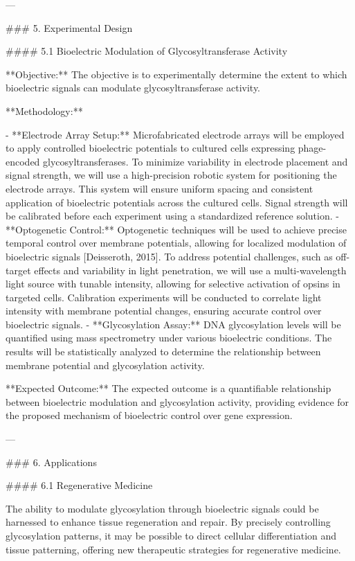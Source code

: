 ---

### 5. Experimental Design

#### 5.1 Bioelectric Modulation of Glycosyltransferase Activity

**Objective:** The objective is to experimentally determine the extent to which bioelectric signals can modulate glycosyltransferase activity.

**Methodology:**

- **Electrode Array Setup:** Microfabricated electrode arrays will be employed to apply controlled bioelectric potentials to cultured cells expressing phage-encoded glycosyltransferases. To minimize variability in electrode placement and signal strength, we will use a high-precision robotic system for positioning the electrode arrays. This system will ensure uniform spacing and consistent application of bioelectric potentials across the cultured cells. Signal strength will be calibrated before each experiment using a standardized reference solution.
- **Optogenetic Control:** Optogenetic techniques will be used to achieve precise temporal control over membrane potentials, allowing for localized modulation of bioelectric signals [Deisseroth, 2015]. To address potential challenges, such as off-target effects and variability in light penetration, we will use a multi-wavelength light source with tunable intensity, allowing for selective activation of opsins in targeted cells. Calibration experiments will be conducted to correlate light intensity with membrane potential changes, ensuring accurate control over bioelectric signals.
- **Glycosylation Assay:** DNA glycosylation levels will be quantified using mass spectrometry under various bioelectric conditions. The results will be statistically analyzed to determine the relationship between membrane potential and glycosylation activity.

**Expected Outcome:** The expected outcome is a quantifiable relationship between bioelectric modulation and glycosylation activity, providing evidence for the proposed mechanism of bioelectric control over gene expression.

---

### 6. Applications

#### 6.1 Regenerative Medicine

The ability to modulate glycosylation through bioelectric signals could be harnessed to enhance tissue regeneration and repair. By precisely controlling glycosylation patterns, it may be possible to direct cellular differentiation and tissue patterning, offering new therapeutic strategies for regenerative medicine.

